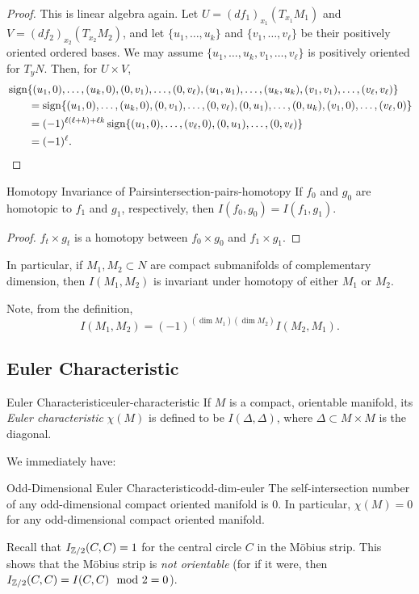 \begin{proof}
    This is linear algebra again. Let $U = (df_1)_{x_1}(T_{x_1} M_1)$ and $V = (df_2)_{x_2}(T_{x_2} M_2)$, and let $\{u_1, \ldots, u_k\}$ and $\{v_1, \ldots, v_\ell\}$ be their positively oriented ordered bases. We may assume $\{u_1, \ldots, u_k, v_1, \ldots, v_\ell\}$ is positively oriented for $T_y N$. Then, for $U \times V$,
    \begin{align*}
        &\operatorname{sign}\{(u_1, 0), \ldots, (u_k, 0), (0, v_1), \ldots, (0, v_\ell), (u_1, u_1), \ldots, (u_k, u_k), (v_1, v_1), \ldots, (v_\ell, v_\ell)\} \\
        &\qquad = \operatorname{sign}\{(u_1, 0), \ldots, (u_k, 0), (0, v_1), \ldots, (0, v_\ell), (0, u_1), \ldots, (0, u_k), (v_1, 0), \ldots, (v_\ell, 0)\} \\
        &\qquad = (-1)^{\ell(\ell + k) + \ell k} \operatorname{sign}\{(u_1, 0), \ldots, (v_\ell, 0), (0, u_1), \ldots, (0, v_\ell)\} \\
        &\qquad = (-1)^\ell.
    \end{align*}
\end{proof}

\begin{proposition}{Homotopy Invariance of Pairs}{intersection-pairs-homotopy}
    If $f_0$ and $g_0$ are homotopic to $f_1$ and $g_1$, respectively, then $I(f_0, g_0) = I(f_1, g_1)$.
\end{proposition}

\begin{proof}
    $f_t \times g_t$ is a homotopy between $f_0 \times g_0$ and $f_1 \times g_1$.
\end{proof}

In particular, if $M_1, M_2 \subset N$ are compact submanifolds of complementary dimension, then $I(M_1, M_2)$ is invariant under homotopy of either $M_1$ or $M_2$.

Note, from the definition,
\[
    I(M_1, M_2) = (-1)^{(\dim M_1)(\dim M_2)} I(M_2, M_1).
\]

\subsection{Euler Characteristic}

\begin{definition}{Euler Characteristic}{euler-characteristic}
    If $M$ is a compact, orientable manifold, its \emph{Euler characteristic} $\chi(M)$ is defined to be $I(\Delta, \Delta)$, where $\Delta \subset M \times M$ is the diagonal.
\end{definition}

We immediately have:

\begin{proposition}{Odd-Dimensional Euler Characteristic}{odd-dim-euler}
    The self-intersection number of any odd-dimensional compact oriented manifold is $0$. In particular, $\chi(M) = 0$ for any odd-dimensional compact oriented manifold.
\end{proposition}

Recall that $I_{\mathbb{Z}/2}(C, C) = 1$ for the central circle $C$ in the M\"obius strip. This shows that the M\"obius strip is \emph{not orientable} (for if it were, then $I_{\mathbb{Z}/2}(C, C) = I(C, C) \mod 2 = 0$).
